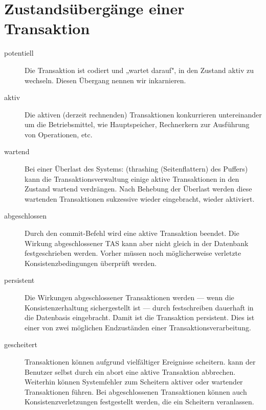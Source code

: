 \documentclass{bschlangaul-theorie}
\begin{document}
\section{Zustandsübergänge einer Transaktion}

\begin{bQuellen}
\item \cite[Kapitel 9.7, Seite 307]{kemper}
\item \cite[Seite 5]{db:fs:5}
\end{bQuellen}

\begin{description}
\item[potentiell]

Die Transaktion ist codiert und „wartet darauf", in den Zustand aktiv zu
wechseln. Diesen Übergang nennen wir inkarnieren.

\item[aktiv]

Die aktiven (\dh derzeit rechnenden) Transaktionen konkurrieren
untereinander um die Betriebsmittel, wie \zB Hauptspeicher, Rechnerkern
zur Ausführung von Operationen, etc.

\item[wartend]

Bei einer Überlast des Systems: (\zB thrashing (Seitenflattern) des
Puffers) kann die Transaktionsverwaltung einige aktive Transaktionen in
den Zustand wartend verdrängen. Nach Behebung der Überlast werden diese
wartenden Transaktionen sukzessive wieder eingebracht, \dh wieder
aktiviert.

\item[abgeschlossen]

Durch den commit-Befehl wird eine aktive Transaktion beendet. Die
Wirkung abgeschlossener TAS kann aber nicht gleich in der Datenbank
festgeschrieben werden. Vorher müssen noch möglicherweise verletzte
Konsistenzbedingungen überprüft werden.

\item[persistent]

Die Wirkungen abgeschlossener Transaktionen werden — wenn die
Konsistenzerhaltung sichergestellt ist — durch festschreiben dauerhaft
in die Datenbasis eingebracht. Damit ist die Transaktion persistent.
Dies ist einer von zwei möglichen Endzuständen einer
Transaktionsverarbeitung.

\item[gescheitert]

Transaktionen können aufgrund vielfältiger Ereignisse scheitern. \ZB
kann der Benutzer selbst durch ein abort eine aktive Transaktion
abbrechen. Weiterhin können Systemfehler zum Scheitern aktiver oder
wartender Transaktionen führen. Bei abgeschlossenen Transaktionen können
auch Konsistenzverletzungen festgestellt werden, die ein Scheitern
veranlassen.


\end{description}
\end{document}
